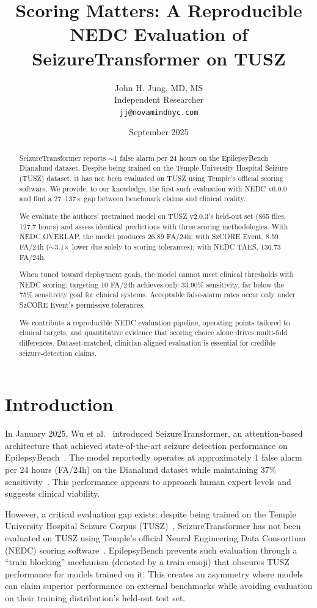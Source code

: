\documentclass[10pt,a4paper]{article}
\title{\textbf{Scoring Matters: A Reproducible NEDC Evaluation of SeizureTransformer on TUSZ}}
\author{
John H. Jung, MD, MS\\
Independent Researcher\\
\texttt{jj@novamindnyc.com}
}
\date{September 2025}
\begin{document}
\maketitle

\begin{abstract}
SeizureTransformer reports $\sim$1 false alarm per 24 hours on the EpilepsyBench Dianalund dataset. Despite being trained on the Temple University Hospital Seizure (TUSZ) dataset, it has not been evaluated on TUSZ using Temple's official scoring software. We provide, to our knowledge, the first such evaluation with NEDC v6.0.0 and find a 27--137$\times$ gap between benchmark claims and clinical reality.

We evaluate the authors' pretrained model on TUSZ v2.0.3's held-out set (865 files, 127.7 hours) and assess identical predictions with three scoring methodologies. With NEDC OVERLAP, the model produces 26.89 FA/24h; with SzCORE Event, 8.59 FA/24h ($\sim$3.1$\times$ lower due solely to scoring tolerances); with NEDC TAES, 136.73 FA/24h.

When tuned toward deployment goals, the model cannot meet clinical thresholds with NEDC scoring: targeting 10 FA/24h achieves only 33.90\% sensitivity, far below the 75\% sensitivity goal for clinical systems. Acceptable false-alarm rates occur only under SzCORE Event's permissive tolerances.

We contribute a reproducible NEDC evaluation pipeline, operating points tailored to clinical targets, and quantitative evidence that scoring choice alone drives multi-fold differences. Dataset-matched, clinician-aligned evaluation is essential for credible seizure-detection claims.
\end{abstract}

\section{Introduction}

In January 2025, Wu et al.~\cite{wu2025seizuretransformer} introduced SeizureTransformer, an attention-based architecture that achieved state-of-the-art seizure detection performance on EpilepsyBench~\cite{wu2024dianalund}. The model reportedly operates at approximately 1 false alarm per 24 hours (FA/24h) on the Dianalund dataset while maintaining 37\% sensitivity~\cite{wu2025seizuretransformer}. This performance appears to approach human expert levels and suggests clinical viability.

However, a critical evaluation gap exists: despite being trained on the Temple University Hospital Seizure Corpus (TUSZ)~\cite{shah2018temple}, SeizureTransformer has not been evaluated on TUSZ using Temple's official Neural Engineering Data Consortium (NEDC) scoring software~\cite{shah2021nedc}. EpilepsyBench prevents such evaluation through a ``train blocking'' mechanism (denoted by a train emoji) that obscures TUSZ performance for models trained on it. This creates an asymmetry where models can claim superior performance on external benchmarks while avoiding evaluation on their training distribution's held-out test set.
\end{document}
